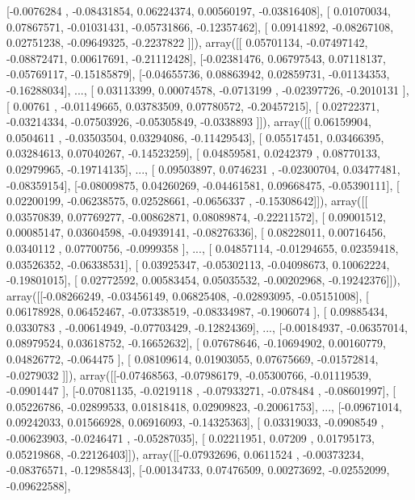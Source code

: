 \documentclass{article}
\begin{document}
       [-0.0076284 , -0.08431854,  0.06224374,  0.00560197, -0.03816408],
       [ 0.01070034,  0.07867571, -0.01031431, -0.05731866, -0.12357462],
       [ 0.09141892, -0.08267108,  0.02751238, -0.09649325, -0.2237822 ]]), array([[ 0.05701134, -0.07497142, -0.08872471,  0.00617691, -0.21112428],
       [-0.02381476,  0.06797543,  0.07118137, -0.05769117, -0.15185879],
       [-0.04655736,  0.08863942,  0.02859731, -0.01134353, -0.16288034],
       ..., 
       [ 0.03113399,  0.00074578, -0.0713199 , -0.02397726, -0.2010131 ],
       [ 0.00761   , -0.01149665,  0.03783509,  0.07780572, -0.20457215],
       [ 0.02722371, -0.03214334, -0.07503926, -0.05305849, -0.0338893 ]]), array([[ 0.06159904,  0.0504611 , -0.03503504,  0.03294086, -0.11429543],
       [ 0.05517451,  0.03466395,  0.03284613,  0.07040267, -0.14523259],
       [ 0.04859581,  0.0242379 ,  0.08770133,  0.02979965, -0.19714135],
       ..., 
       [ 0.09503897,  0.0746231 , -0.02300704,  0.03477481, -0.08359154],
       [-0.08009875,  0.04260269, -0.04461581,  0.09668475, -0.05390111],
       [ 0.02200199, -0.06238575,  0.02528661, -0.0656337 , -0.15308642]]), array([[ 0.03570839,  0.07769277, -0.00862871,  0.08089874, -0.22211572],
       [ 0.09001512,  0.00085147,  0.03604598, -0.04939141, -0.08276336],
       [ 0.08228011,  0.00716456,  0.0340112 ,  0.07700756, -0.0999358 ],
       ..., 
       [ 0.04857114, -0.01294655,  0.02359418,  0.03526352, -0.06338531],
       [ 0.03925347, -0.05302113, -0.04098673,  0.10062224, -0.19801015],
       [ 0.02772592,  0.00583454,  0.05035532, -0.00202968, -0.19242376]]), array([[-0.08266249, -0.03456149,  0.06825408, -0.02893095, -0.05151008],
       [ 0.06178928,  0.06452467, -0.07338519, -0.08334987, -0.1906074 ],
       [ 0.09885434,  0.0330783 , -0.00614949, -0.07703429, -0.12824369],
       ..., 
       [-0.00184937, -0.06357014,  0.08979524,  0.03618752, -0.16652632],
       [ 0.07678646, -0.10694902,  0.00160779,  0.04826772, -0.064475  ],
       [ 0.08109614,  0.01903055,  0.07675669, -0.01572814, -0.0279032 ]]), array([[-0.07468563, -0.07986179, -0.05300766, -0.01119539, -0.0901447 ],
       [-0.07081135, -0.0219118 , -0.07933271, -0.078484  , -0.08601997],
       [ 0.05226786, -0.02899533,  0.01818418,  0.02909823, -0.20061753],
       ..., 
       [-0.09671014,  0.09242033,  0.01566928,  0.06916093, -0.14325363],
       [ 0.03319033, -0.0908549 , -0.00623903, -0.0246471 , -0.05287035],
       [ 0.02211951,  0.07209   ,  0.01795173,  0.05219868, -0.22126403]]), array([[-0.07932696,  0.0611524 , -0.00373234, -0.08376571, -0.12985843],
       [-0.00134733,  0.07476509,  0.00273692, -0.02552099, -0.09622588],
\end{document}
